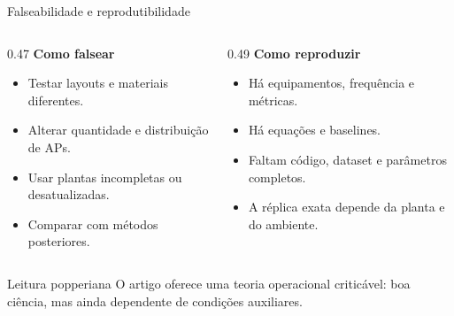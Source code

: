 \documentclass[aspectratio=169,11pt]{beamer}
\begin{document}
\begin{frame}{Falseabilidade e reprodutibilidade}
  \footnotesize
  \begin{columns}[T]
    \begin{column}{0.47\textwidth}
      \textbf{Como falsear}
      \begin{itemize}
        \item Testar layouts e materiais diferentes.
        \item Alterar quantidade e distribuição de APs.
        \item Usar plantas incompletas ou desatualizadas.
        \item Comparar com métodos posteriores.
      \end{itemize}
    \end{column}
    \begin{column}{0.49\textwidth}
      \textbf{Como reproduzir}
      \begin{itemize}
        \item Há equipamentos, frequência e métricas.
        \item Há equações e baselines.
        \item Faltam código, dataset e parâmetros completos.
        \item A réplica exata depende da planta e do ambiente.
      \end{itemize}
    \end{column}
  \end{columns}

  \vspace{0.25cm}
  \begin{alertblock}{Leitura popperiana}
    O artigo oferece uma teoria operacional criticável: boa ciência, mas ainda dependente de condições auxiliares.
  \end{alertblock}

\end{frame}
\end{document}
